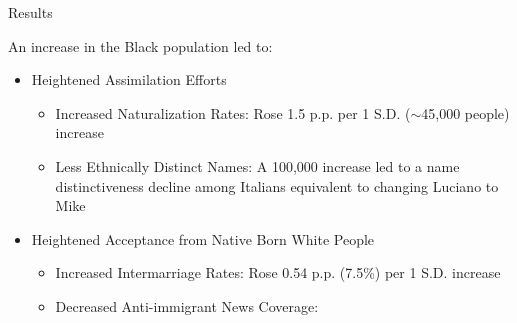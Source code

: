 \documentclass[11pt, aspectratio=169]{beamer}
\begin{document}
\begin{frame}{Results}

An increase in the Black population led to:

    \begin{itemize}
        \item Heightened Assimilation Efforts
            \begin{itemize}
                \item Increased Naturalization Rates: Rose 1.5 p.p. per 1 S.D. ($\sim$45,000 people) increase
                \item Less Ethnically Distinct Names: A 100,000 increase led to a name distinctiveness decline among Italians equivalent to changing Luciano to Mike
            \end{itemize}
        \item Heightened Acceptance from Native Born White People
            \begin{itemize}
                \item Increased Intermarriage Rates: Rose 0.54 p.p. (7.5\%) per 1 S.D. increase
                \item Decreased Anti-immigrant News Coverage: 
            \end{itemize}
    \end{itemize}

\end{frame}
\end{document}
